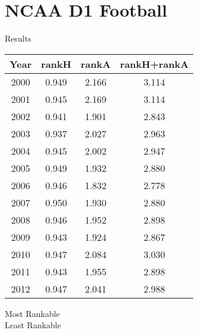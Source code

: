 \documentclass{beamer}
\begin{document}
\section{NCAA D1 Football}

\begin{frame}{Results}
\begin{minipage}{0.6\textwidth}
\centering
\begin{tabular}{|| c | c | c | c ||}
\hline
Year & rankH & rankA & rankH+rankA \\
\hline\hline
\rowcolor{text}
2000 & 0.949 & 2.166 & 3.114 \\
\hline
\rowcolor{text}
2001 & 0.945 & 2.169 & 3.114 \\
\hline
2002 & 0.941 & 1.901 & 2.843 \\
\hline
2003 & 0.937 & 2.027 & 2.963 \\
\hline
2004 & 0.945 & 2.002 & 2.947 \\
\hline
2005 & 0.949 & 1.932 & 2.880 \\
\hline
\rowcolor{secondary}
2006 & 0.946 & 1.832 & 2.778 \\
\hline
2007 & 0.950 & 1.930 & 2.880 \\
\hline
2008 & 0.946 & 1.952 & 2.898 \\
\hline
2009 & 0.943 & 1.924 & 2.867 \\
\hline
2010 & 0.947 & 2.084 & 3.030 \\
\hline
2011 & 0.943 & 1.955 & 2.898 \\
\hline
2012 & 0.947 & 2.041 & 2.988 \\
\hline
\end{tabular}
\end{minipage}\hfill
\begin{minipage}{0.3\textwidth}
\vfill
{}\quad Most Rankable\\
\vfill
{}\quad Least Rankable\\
\vfill
\end{minipage}
\end{frame}
\end{document}
